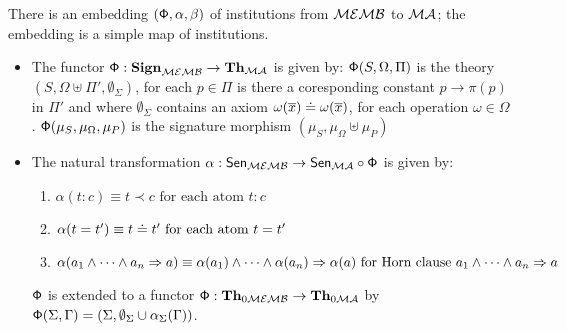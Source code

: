 \documentclass[10pt]{article}
\begin{document}
\begin{proposition}
There is an embedding $({\sf {\Phi}},\alpha, \beta)$ of institutions from ${\mathcal{MEMB}}$ 
to ${\mathcal{MA}}$; the embedding is a simple map of institutions.
\end{proposition}
%
\begin{PROOF}
	\begin{itemize}
		\item The functor ${\sf {\Phi}}: {\bf Sign}_{{\mathcal{MEMB}}} \to {\bf Th}_{{\mathcal{MA}}}$ 
is given by:  ${\sf {\Phi}}(S,\Omega,\Pi)$ is the theory $(S,\Omega \uplus \Pi', 
\emptyset_{\Sigma})$, for each $p \in \Pi$ is there a coresponding constant $p \to \pi(p)$ in $\Pi'$ and where $\emptyset_{\Sigma}$ contains an axiom 
$\omega(\overline{x}) \mathrel{\dot{=} } \omega(\overline{x})$, for each operation $\omega 
\in \Omega$. ${\sf {\Phi}}(\mu_S,\mu_{\Omega},\mu_P)$ is the signature morphism 
$(\mu_S,\mu_{\Omega} \uplus \mu_P)$
	
\item The natural transformation $\alpha: {\sf {Sen}}_{{\mathcal{MEMB}}} \to 
{\sf {Sen}}_{{\mathcal{MA}}} \circ {\sf {\Phi}}$ is given by:
	\begin{enumerate}
	\item $\alpha(t:c) \equiv t \prec c\mbox{ for each atom }t:c$
	 \item $\alpha(t=t') \equiv t \mathrel{\dot{=} } t'\mbox{ for each atom }t = t'$
	 \item $\alpha(a_1 \wedge \cdots \wedge a_n \Rightarrow 
a) \equiv \alpha(a_1) \wedge \cdots \wedge \alpha(a_n) \Rightarrow 
\alpha(a)\mbox{ for  Horn clause }a_1 \wedge \cdots \wedge a_n \Rightarrow a$
	\end{enumerate}
${\sf {\Phi}}$ is extended to a functor 
${\sf {\Phi}}: {\bf Th}_{0{\mathcal{MEMB}}} \to {\bf Th}_{0{\mathcal{MA}}}$ by 
${\sf {\Phi}}(\Sigma,\Gamma) = (\Sigma,\emptyset_\Sigma\cup\alpha_\Sigma(\Gamma))$.


\end{itemize}
\end{PROOF}
\end{document}
